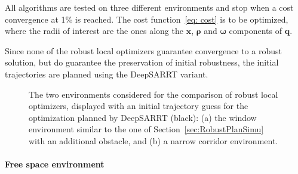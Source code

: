 All algorithms are tested on three different environments and stop when a cost convergence at 1\% is reached.
The cost function~\eqref{eq: cost} is to be optimized, where the radii of interest are the ones along the $\boldsymbol{x}$, $\boldsymbol{\rho}$ and $\boldsymbol{\omega}$ components of $\boldsymbol{q}$.

Since none of the robust local optimizers guarantee convergence to a robust solution, but do guarantee the preservation of initial robustness, the initial trajectories are planned using the DeepSARRT variant.

\begin{figure} [htp]
    \centering
    \caption{The two environments considered for the comparison of robust local optimizers, displayed with an initial trajectory guess for the optimization planned by DeepSARRT (black):
    (a) the window environment similar to the one of Section~\ref{sec:RobustPlanSimu} with an additional obstacle, and (b) a narrow corridor environment.}%
\end{figure}

\paragraph{Free space environment}

